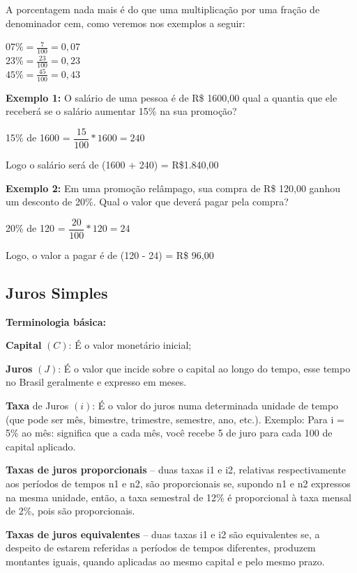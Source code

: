 \begin{multicols*}{2}
    A porcentagem nada mais é do que uma multiplicação por uma fração de denominador cem, como veremos nos exemplos a seguir:

    $ 07\% = \frac{7}{100} = 0,07 $\\

    $ 23\% = \frac{23}{100} = 0,23 $\\

    $ 45\% = \frac{45}{100} = 0,43 $

    \textbf{Exemplo 1:} O salário de uma pessoa é de R\$ 1600,00 qual a quantia que ele receberá se o salário aumentar 15\% na sua promoção?

    15\% de 1600  =  $\dfrac{15}{100}*1600 = 240$

    Logo o salário será de (1600 + 240) = R\$1.840,00

    \textbf{Exemplo 2:} Em uma promoção relâmpago, sua compra de R\$ 120,00 ganhou um desconto de 20\%. Qual o valor que deverá pagar pela compra?

    20\% de 120  =  $\dfrac{20}{100} * 120 = 24$

    Logo, o valor a pagar é de (120 - 24) = R\$ 96,00

    \subsection{Juros Simples}

    \textbf{Terminologia básica:}

    \textbf{Capital} $(C)$: É o valor monetário inicial;

    \textbf{Juros} $(J)$: É o valor que incide sobre o capital ao longo do tempo, esse tempo no Brasil geralmente e expresso em meses.

    \textbf{Taxa} de Juros $(i)$: É o valor do juros numa determinada unidade de tempo (que pode ser mês, bimestre, trimestre, semestre, ano, etc.). Exemplo: Para i = 5\% ao mês: significa que a cada mês, você recebe 5 de juro para cada 100 de capital aplicado.

    \textbf{Taxas de juros proporcionais} – duas taxas  i1 e i2, relativas respectivamente aos períodos de tempos n1 e n2, são proporcionais se, supondo n1 e n2 expressos na mesma unidade, então, a taxa semestral de 12\% é proporcional à taxa mensal de 2\%, pois são proporcionais.

    \textbf{Taxas de juros equivalentes} – duas taxas i1 e i2 são equivalentes se, a despeito de estarem referidas a períodos de tempos diferentes, produzem montantes iguais, quando aplicadas ao mesmo capital e pelo mesmo prazo.


\end{multicols*}

